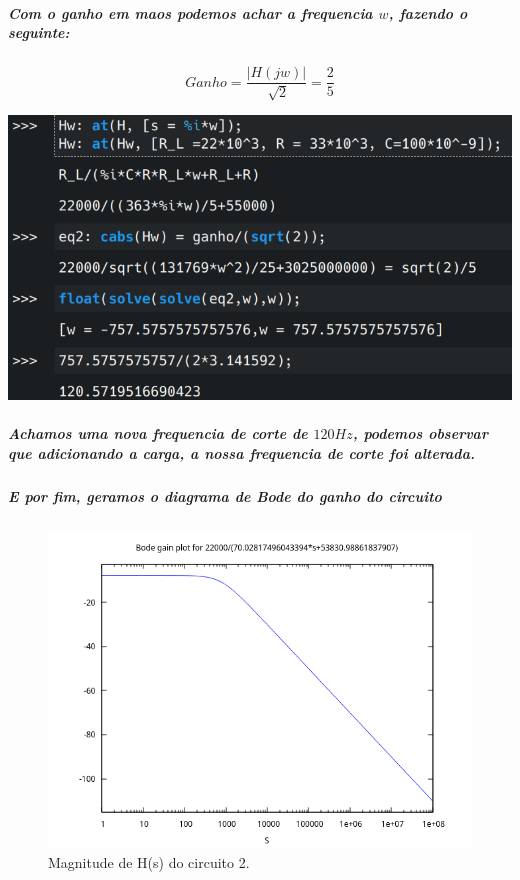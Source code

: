 \documentclass[12pt,twoside, a4paper, twocolumn]{article}
\begin{document}
\subparagraph*{Com o ganho em maos podemos achar a frequencia $w$, fazendo o seguinte:}

\begin{equation*}
    Ganho = \frac{ | H(jw) |}{\sqrt[]{2}} = \frac{2}{5}
\end{equation*}

\begin{adjustbox}{scale=0.4}
    \includegraphics{freqcorte2.png}
\end{adjustbox}

\subparagraph*{Achamos uma nova frequencia de corte de $120Hz$, podemos observar que adicionando a carga, a nossa frequencia de corte foi alterada.}

\subparagraph*{E por fim, geramos o diagrama de Bode do ganho do circuito}

\begin{figure}[h]
    \centering
    \includegraphics[width=1\columnwidth]{images/bodegain2.png}
    \caption{Magnitude de H(s) do circuito 2.}
\end{figure}
\end{document}
